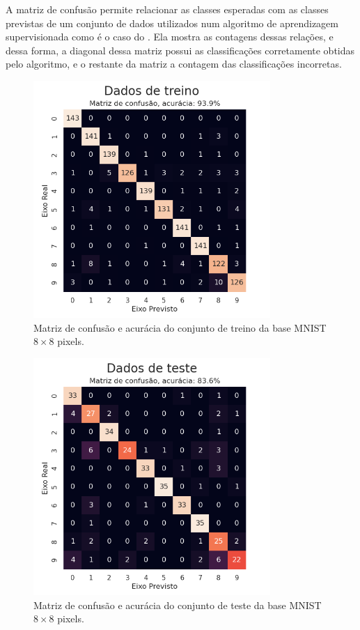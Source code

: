 A matriz de confusão permite relacionar as classes esperadas com as classes previstas de um conjunto de dados utilizados num algoritmo de aprendizagem supervisionada como é o caso do . Ela mostra as contagens dessas relações, e dessa forma, a diagonal dessa matriz possui as classificações corretamente obtidas pelo algoritmo, e o restante da matriz a contagem das classificações incorretas.

\begin{figure}[htb]
\centering
\includegraphics[width=9cm]{figuras/mnist_treino}
\caption{Matriz de confusão e acurácia do conjunto de treino da base MNIST ${8\times8}$ pixels.}
\label{fig:mnist_treino}
\end{figure}

\begin{figure}[htb]
\centering
\includegraphics[width=9cm]{figuras/mnist_test}
\caption{Matriz de confusão e acurácia do conjunto de teste da base MNIST ${8\times8}$ pixels.}
\label{fig:mnist_test}
\end{figure}

